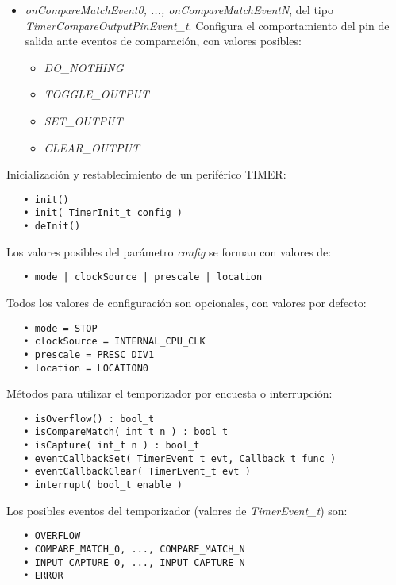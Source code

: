 \begin{itemize}
\item
\emph{onCompareMatchEvent0, ..., onCompareMatchEventN}, del tipo \emph{TimerCompareOutputPinEvent\_t}. Configura el comportamiento del pin de salida ante eventos de comparación, con valores posibles:
\begin{itemize}
\item \emph{DO\_NOTHING}
\item \emph{TOGGLE\_OUTPUT}
\item \emph{SET\_OUTPUT}
\item \emph{CLEAR\_OUTPUT}
\end{itemize}
\end{itemize}


Inicialización y restablecimiento de un periférico TIMER:

\begin{verbatim}
   • init()
   • init( TimerInit_t config )
   • deInit()
\end{verbatim}

Los valores posibles del parámetro \emph{config} se forman con valores de:

\begin{verbatim}
   • mode | clockSource | prescale | location
\end{verbatim}

Todos los valores de configuración son opcionales, con valores por defecto:

\begin{verbatim}
   • mode = STOP
   • clockSource = INTERNAL_CPU_CLK
   • prescale = PRESC_DIV1
   • location = LOCATION0   
\end{verbatim}

Métodos para utilizar el temporizador por encuesta o interrupción:

\begin{verbatim}
   • isOverflow() : bool_t
   • isCompareMatch( int_t n ) : bool_t
   • isCapture( int_t n ) : bool_t
   • eventCallbackSet( TimerEvent_t evt, Callback_t func )
   • eventCallbackClear( TimerEvent_t evt )
   • interrupt( bool_t enable )
\end{verbatim}

Los posibles eventos del temporizador (valores de \emph{TimerEvent\_t}) son:

\begin{verbatim}
   • OVERFLOW
   • COMPARE_MATCH_0, ..., COMPARE_MATCH_N
   • INPUT_CAPTURE_0, ..., INPUT_CAPTURE_N
   • ERROR
\end{verbatim}

